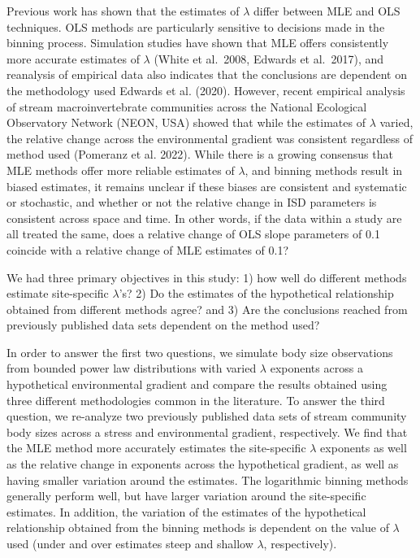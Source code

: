 \documentclass[
]{article}
\begin{document}
Previous work has shown that the estimates of \(\lambda\) differ between
MLE and OLS techniques. OLS methods are particularly sensitive to
decisions made in the binning process. Simulation studies have shown
that MLE offers consistently more accurate estimates of \(\lambda\)
(White et al.~2008, Edwards et al.~2017), and reanalysis of empirical
data also indicates that the conclusions are dependent on the
methodology used Edwards et al. (2020). However, recent empirical
analysis of stream macroinvertebrate communities across the National
Ecological Observatory Network (NEON, USA) showed that while the
estimates of \(\lambda\) varied, the relative change across the
environmental gradient was consistent regardless of method used
(Pomeranz et al. 2022). While there is a growing consensus that MLE
methods offer more reliable estimates of \(\lambda\), and binning
methods result in biased estimates, it remains unclear if these biases
are consistent and systematic or stochastic, and whether or not the
relative change in ISD parameters is consistent across space and time.
In other words, if the data within a study are all treated the same,
does a relative change of OLS slope parameters of 0.1 coincide with a
relative change of MLE estimates of 0.1?

We had three primary objectives in this study: 1) how well do different
methods estimate site-specific \(\lambda\)'s? 2) Do the estimates of the
hypothetical relationship obtained from different methods agree? and 3)
Are the conclusions reached from previously published data sets
dependent on the method used?

In order to answer the first two questions, we simulate body size
observations from bounded power law distributions with varied
\(\lambda\) exponents across a hypothetical environmental gradient and
compare the results obtained using three different methodologies common
in the literature. To answer the third question, we re-analyze two
previously published data sets of stream community body sizes across a
stress and environmental gradient, respectively. We find that the MLE
method more accurately estimates the site-specific \(\lambda\) exponents
as well as the relative change in exponents across the hypothetical
gradient, as well as having smaller variation around the estimates. The
logarithmic binning methods generally perform well, but have larger
variation around the site-specific estimates. In addition, the variation
of the estimates of the hypothetical relationship obtained from the
binning methods is dependent on the value of \(\lambda\) used (under and
over estimates steep and shallow \(\lambda\), respectively).
\end{document}
